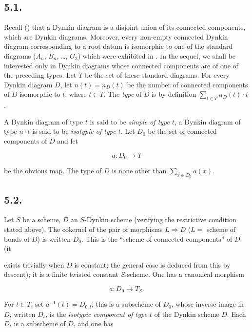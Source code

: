 \subsection*{5.1.}

Recall () that a Dynkin diagram is a disjoint union of its connected components, which are Dynkin diagrams.
Moreover, every non-empty connected Dynkin diagram corresponding to a root datum is isomorphic to one of the standard
diagrams (\(A_{n}\), \(B_{n}\), \ldots, \(G_2\)) which were exhibited in . In the sequel, we shall be interested
only in Dynkin diagrams whose connected components are of one of the preceding types. Let \(T\) be the set of these
standard diagrams. For every Dynkin diagram \(D\), let \(n(t) = n_{D}(t)\) be the number of connected components of \(D\)
isomorphic to \(t\), where \(t \in T\). The \emph{type} of \(D\) is by definition \(\sum_{t \in T} n_{D}(t) \cdot t\).

A Dynkin diagram of type \(t\) is said to be \emph{simple of type \(t\)}, a Dynkin diagram of type \(n \cdot t\) is said to be
\emph{isotypic of type \(t\)}. Let \(D_0\) be the set of connected components of \(D\) and let

\[ a : D_{0} \to T \]

be the obvious map. The type of \(D\) is none other than \(\sum_{x \in D_{0}} a(x)\).

\subsection*{5.2.}

Let \(S\) be a scheme, \(D\) an \(S\)-Dynkin scheme (verifying the restrictive condition stated above). The cokernel of the
pair of morphisms \(L \Rightarrow D\) (\(L =\) scheme of bonds of \(D\)) is written \(D_0\). This is the ``scheme
of connected components'' of \(D\) (it

exists trivially when \(D\) is constant; the general case is deduced from this by descent); it is a finite twisted
constant \(S\)-scheme. One has a canonical morphism

\[ a : D_{0} \to T_{S}. \]

For \(t \in T\), set \(a^{-1}(t) = D_{0, t}\); this is a subscheme of \(D_0\), whose inverse image in \(D\), written \(D_{t}\), is
the \emph{isotypic component of type \(t\)} of the Dynkin scheme \(D\). Each \(D_{t}\) is a subscheme of \(D\), and one has

